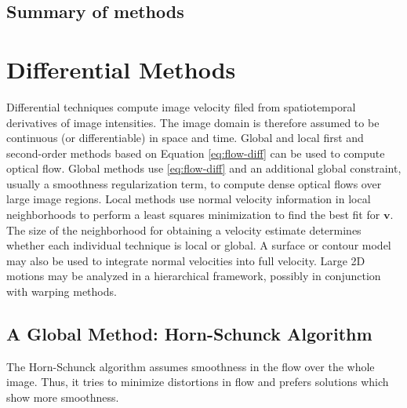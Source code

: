 \documentclass[letterpaper,12pt]{article}
\begin{document}
\subsection{Summary of methods}

\newpage

\section{Differential Methods}
Differential techniques compute image velocity filed from spatiotemporal derivatives of image intensities. The image domain
is therefore assumed to be continuous (or differentiable) in space and time. Global and local first and second-order methods
based on Equation \eqref{eq:flow-diff} can be used to compute optical flow. Global methods use
\eqref{eq:flow-diff} and an additional global constraint, usually a smoothness regularization term, to compute dense optical flows over
large image regions. Local methods use normal velocity information in local neighborhoods to perform a least squares minimization to find the best fit for $\mathbf{v}$.
The size of the neighborhood for obtaining a velocity estimate determines whether each individual technique is local or global. A surface or contour model may also be used to integrate normal velocities into full velocity. Large 2D motions may be analyzed in a hierarchical framework, possibly in conjunction with warping methods.

\subsection{A Global Method: Horn-Schunck Algorithm}
\label{sec:Horn-Schunck}
The Horn-Schunck algorithm \citep{Horn:Schunck:1981} assumes smoothness in the flow over the whole image. Thus, it tries to minimize distortions in flow and prefers solutions which show more smoothness.
\end{document}
